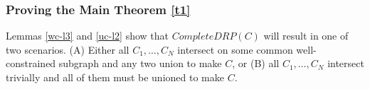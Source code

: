 

\subsubsection{Proving the Main Theorem \ref{t1}}\label{sec:maintheorem}
Lemmas \ref{wc-l3} and \ref{uc-l2} show that $CompleteDRP(C)$ will result in one of two scenarios. (A) Either all $C_1,\ldots,C_N$ intersect on some common well-constrained subgraph and any two union to make $C$, or (B) all $C_1,\ldots,C_N$ intersect trivially and all of them must be unioned to make $C$.














